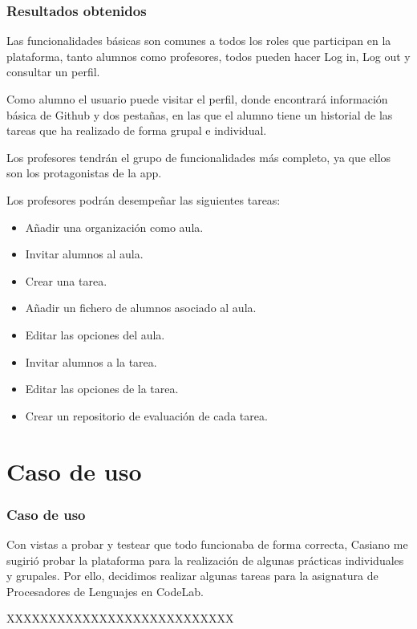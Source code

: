 \documentclass{beamer}
\begin{document}
\begin{frame}[allowframebreaks]
\frametitle{Resultados obtenidos}


  \framebreak
  
  Las funcionalidades básicas son comunes a todos los roles que participan en la plataforma, 
  tanto alumnos como profesores, todos pueden hacer Log in, Log out y consultar un perfil.
  
  \bigskip
  
  Como alumno el usuario puede visitar el perfil, donde encontrará información básica de Github y dos pestañas, 
  en las que el alumno tiene un historial de las tareas que ha realizado de forma grupal e individual.
  
  \bigskip

  Los profesores tendrán el grupo de funcionalidades más completo, ya que ellos son los protagonistas 
  de la app.

  \framebreak

  Los profesores podrán desempeñar las siguientes tareas:

  \begin{itemize}
    \item Añadir una organización como aula.
    \item Invitar alumnos al aula.
    \item Crear una tarea.
    \item Añadir un fichero de alumnos asociado al aula.
    \item Editar las opciones del aula.
    \item Invitar alumnos a la tarea.
    \item Editar las opciones de la tarea.
    \item Crear un repositorio de evaluación de cada tarea.
  \end{itemize}

\end{frame}

  
\section{Caso de uso}

\begin{frame}[allowframebreaks]
\frametitle{Caso de uso}

  Con vistas a probar y testear que todo funcionaba de forma correcta, Casiano me sugirió probar 
  la plataforma para la realización de algunas prácticas individuales y grupales. Por ello, decidimos 
  realizar algunas tareas para la asignatura de Procesadores de Lenguajes en CodeLab.

  \framebreak

  XXXXXXXXXXXXXXXXXXXXXXXXXXX

\end{frame}
\end{document}
